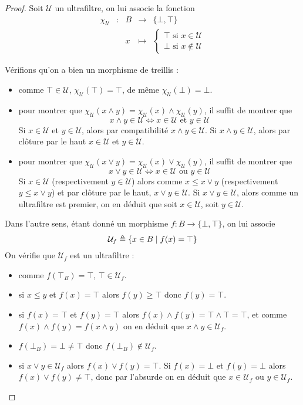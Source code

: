 \begin{proof}
  Soit $\mathcal U$ un ultrafiltre, on lui associe la fonction
  \[\begin{array}{ccccc}
  \chi_{\mathcal U} & : & B & \longrightarrow & \{\bot,\top\}\\
  & & x &\longmapsto& \begin{cases}
    \top\text{ si } x\in \mathcal U\\
    \bot\text{ si } x\notin\mathcal U
  \end{cases}
  \end{array}\]

  Vérifions qu'on a bien un morphisme de treillis :
  \begin{itemize}
  \item comme $\top\in\mathcal U$, $\chi_\mathcal U(\top) = \top$, de même
    $\chi_\mathcal U(\bot) = \bot$.
  \item pour montrer que
    $\chi_\mathcal U(x\land y) = \chi_\mathcal U(x)\land\chi_\mathcal U(y)$, il
    suffit de montrer que
    \[x\land y \in \mathcal U \iff x\in\mathcal U \text{ et }y\in\mathcal U\]
    Si $x\in \mathcal U$ et $y\in\mathcal U$, alors par compatibilité
    $x\land y \in \mathcal U$. Si $x\land y \in \mathcal U$, alors par clôture
    par le haut $x\in \mathcal U$ et $y\in \mathcal U$.
  \item pour montrer que
    $\chi_\mathcal U(x\lor y) = \chi_\mathcal U(x)\lor\chi_\mathcal U(y)$, il
    suffit de montrer que
    \[x\lor y \in \mathcal U \iff x\in\mathcal U \text{ ou }y\in\mathcal U\]
    Si $x\in \mathcal U$ (respectivement $y\in \mathcal U$) alors comme
    $x\leq x\lor y$ (respectivement $y\leq x\lor y$) et par clôture par le haut,
    $x\lor y \in \mathcal U$. Si $x\lor y \in \mathcal U$, alors comme un
    ultrafiltre est premier, on en déduit que soit $x\in\mathcal U$, soit
    $y\in \mathcal U$.
  \end{itemize}

  Dans l'autre sens, étant donné un morphisme $f : B \to \{\bot,\top\}$, on lui
  associe
  \[\mathcal U_f \triangleq \{x\in B \mid f(x) = \top\}\]
  On vérifie que $\mathcal U_f$ est un ultrafiltre :
  \begin{itemize}
  \item comme $f(\top_B) = \top$, $\top\in \mathcal U_f$.
  \item si $x\leq y$ et $f(x)=\top$ alors $f(y)\geq \top$ donc $f(y)=\top$.
  \item si $f(x) = \top$ et $f(y)=\top$ alors
    $f(x)\land f(y) = \top\land\top =\top$, et comme
    $f(x)\land f(y)=f(x\land y)$ on en déduit que $x\land y \in \mathcal U_f$.
  \item $f(\bot_B)=\bot\neq\top$ donc $f(\bot_B)\notin\mathcal U_f$.
  \item si $x\lor y \in \mathcal U_f$ alors $f(x)\lor f(y) = \top$. Si
    $f(x) = \bot$ et $f(y) = \bot$ alors $f(x)\lor f(y) \neq \top$, donc par
    l'absurde on en déduit que $x\in \mathcal U_f$ ou $y\in \mathcal U_f$.
  \end{itemize}


\end{proof}

